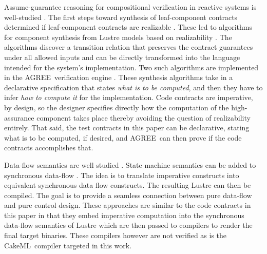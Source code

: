 \documentclass[global,twocolumn]{svjour}
\newcommand{\agr}{AGREE}
\newcommand{\ckml}{CakeML}
\begin{document}
Assume-guarantee reasoning for compositional verification in reactive systems is well-studied \cite{10.1007/978-3-642-28891-3_13, 10.1145/2658982.2527272, 10.1007/978-3-319-17524-9_7}.
%
The first steps toward synthesis of leaf-component contracts determined if leaf-component contracts are realizable \cite{10.1007/978-3-319-17524-9_13, 10.1007/978-3-319-29613-5_7}.
%
These led to algorithms for component synthesis from Lustre models based on realizability \cite{katis2017synthesis, 10.1007/978-3-319-89963-3_10}.
%
The algorithms discover a transition relation that preserves the contract guarantees under all allowed inputs and can be directly transformed into the language intended for the system's implementation.
%
Two such algorithms are implemented in the \agr\ verification engine \cite{jkind}.
%
These synthesis algorithms take in a declarative specification that states \emph{what is to be computed}, and then they have to infer \emph{how to compute it} for the implementation.
%
Code contracts are imperative, by design, so the designer specifies directly how the computation of the high-assurance component takes place thereby avoiding the question of realizability entirely.
%
That said, the test contracts in this paper can be declarative, stating what is to be computed, if desired, and \agr\ can then prove if the code contracts accomplishes that.

Data-flow semantics are well studied \cite{10.1145/41625.41641,97300, 10.1145/1379023.1375674,10.1145/2345141.2248426,10.1007/978-3-540-45212-6_10}.
%
State machine semantics can be added to synchronous data-flow \cite{10.1145/1086228.1086261}.
%
The idea is to translate imperative constructs into equivalent synchronous data flow constructs.
%
The resulting Lustre can then be compiled. The goal is to provide a seamless connection between pure data-flow and pure control design.
%
These approaches are similar to the code contracts in this paper in that they embed imperative computation into the synchronous data-flow semantics of Lustre which are then passed to compilers to render the final target binaries.
%
These compilers however are not verified as is the \ckml\ compiler targeted in this work.
\end{document}
